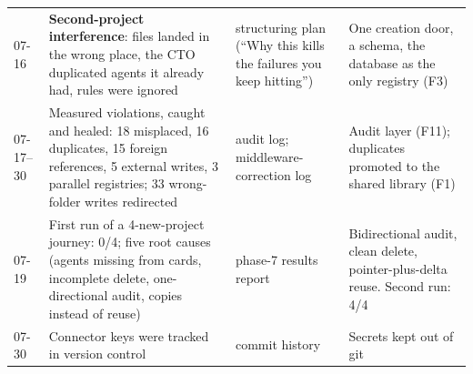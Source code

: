 \begin{table}[t]
\begin{tabular}{@{}p{0.6cm}p{5.6cm}p{4.6cm}p{5.6cm}@{}}
07-16 & \textbf{Second-project interference}: files landed in the wrong place, the CTO duplicated agents it already had, rules were ignored & structuring plan (``Why this kills the failures you keep hitting'') & One creation door, a schema, the database as the only registry (F3) \\
07-17--30 & Measured violations, caught and healed: 18 misplaced, 16 duplicates, 15 foreign references, 5 external writes, 3 parallel registries; 33 wrong-folder writes redirected & audit log; middleware-correction log & Audit layer (F11); duplicates promoted to the shared library (F1) \\
07-19 & First run of a 4-new-project journey: 0/4; five root causes (agents missing from cards, incomplete delete, one-directional audit, copies instead of reuse) & phase-7 results report & Bidirectional audit, clean delete, pointer-plus-delta reuse. Second run: 4/4 \\
07-30 & Connector keys were tracked in version control & commit history & Secrets kept out of git \\
\bottomrule
\end{tabular}
\end{table}
